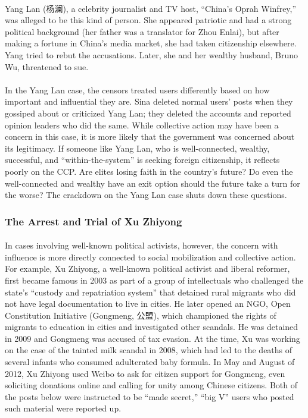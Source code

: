 \documentclass[12pt]{article}
\begin{document}
\begin{CJK*}{UTF8}{gbsn}
\paragraph{} Yang Lan (杨澜), a celebrity journalist and TV host, ``China's Oprah Winfrey,'' was alleged to be this kind of person. She appeared patriotic and had a strong political background (her father was a translator for Zhou Enlai), but after making a fortune in China's media market, she had taken citizenship elsewhere. Yang tried to rebut the accusations. Later, she and her wealthy husband, Bruno Wu, threatened to sue.
\paragraph{} In the Yang Lan case, the censors treated users differently based on how important and influential they are. Sina deleted normal users' posts when they gossiped about or criticized Yang Lan; they deleted the accounts and reported opinion leaders who did the same. While collective action may have been a concern in this case, it is more likely that the government was concerned about its legitimacy. If someone like Yang Lan, who is well-connected, wealthy, successful, and ``within-the-system'' is seeking foreign citizenship, it reflects poorly on the CCP. Are elites losing faith in the country's future? Do even the well-connected and wealthy have an exit option should the future take a turn for the worse? The crackdown on the Yang Lan case shuts down these questions.

\subsubsection{The Arrest and Trial of Xu Zhiyong}
\paragraph{} In cases involving well-known political activists, however, the concern with influence is more directly connected to social mobilization and collective action. For example, Xu Zhiyong, a well-known political activist and liberal reformer, first became famous in 2003 as part of a group of intellectuals who challenged the state's ``custody and repatriation system'' that detained rural migrants who did not have legal documentation to live in cities. He later opened an NGO, Open Constitution Initiative (Gongmeng, 公盟), which championed the rights of migrants to education in cities and investigated other scandals. He was detained in 2009 and Gongmeng was accused of tax evasion. At the time, Xu was working on the case of the tainted milk scandal in 2008, which had led to the deaths of several infants who consumed adulterated baby formula. In May and August of 2012, Xu Zhiyong used Weibo to ask for citizen support for Gongmeng, even soliciting donations online and calling for unity among Chinese citizens. Both of the posts below were instructed to be ``made secret,'' ``big V'' users who posted such material were reported up.


\end{CJK*}
\end{document}
